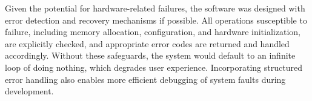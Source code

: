 \documentclass[12pt, titlepage]{article}
\begin{document}
Given the potential for hardware-related failures, the software was designed
with error detection and recovery mechanisms if possible. All operations
susceptible to failure, including memory allocation, configuration, and hardware
initialization, are explicitly checked, and appropriate error codes are returned
and handled accordingly. Without these safeguards, the system would default to
an infinite loop of doing nothing, which degrades user experience. Incorporating
structured error handling also enables more efficient debugging of system faults
during development.

\newpage 



\end{document}
